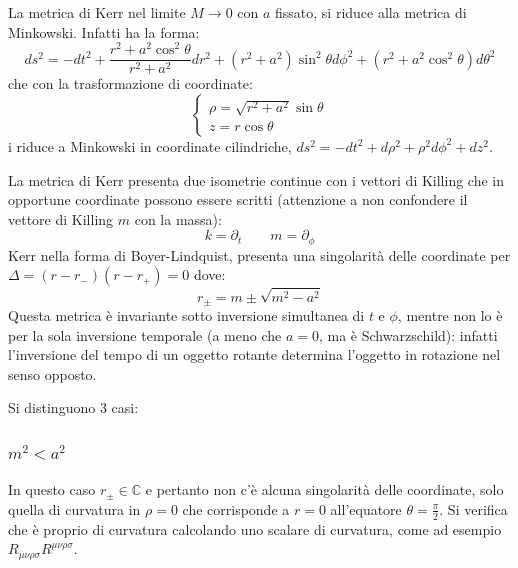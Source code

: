 La metrica di Kerr nel limite $M\rightarrow 0$ con $a$ fissato, si riduce alla metrica di Minkowski. Infatti ha la forma:
\begin{equation*}
    ds^2 = -dt^2 + \frac{r^2 + a^2\cos^2\theta}{r^2 + a^2}dr^2 + (r^2+a^2)\sin^2\theta d\phi^2 + (r^2 + a^2\cos^2\theta)d\theta^2
\end{equation*}
che con la trasformazione di coordinate:
\begin{equation*}
    \left\{ \begin{array}{l}
        \rho = \sqrt{r^2 + a^2}\sin\theta \\
        z = r\cos\theta          
    \end{array}\right.
\end{equation*}
i riduce a Minkowski in coordinate cilindriche, $ds^2 = -dt^2 + d\rho^2 +\rho^2 d\phi^2 + dz^2$.

La metrica di Kerr presenta due isometrie continue con i vettori di Killing che in opportune coordinate possono essere scritti (attenzione a non confondere il vettore di Killing $m$ con la massa):
\begin{equation*}
    k = \partial_t \qquad m =\partial_\phi
\end{equation*}
Kerr nella forma di Boyer-Lindquist, presenta una singolarità delle coordinate per $\Delta = (r - r_-)(r-r_+) = 0$ dove:
\begin{equation*}
    r_\pm = m \pm \sqrt{ m^2 - a^2}
\end{equation*}
Questa metrica è invariante sotto inversione simultanea di $t$ e $\phi$, mentre non lo è per la sola inversione temporale (a meno che $a=0$, ma è Schwarzschild): infatti l'inversione del tempo di un oggetto rotante determina l'oggetto in rotazione nel senso opposto.

Si distinguono 3 casi:

\subsubsection{$m^2 < a^2$} 
In questo caso $r_\pm \in \mathbb{C}$ e pertanto non c'è alcuna singolarità delle coordinate, solo quella di curvatura in $\rho = 0$ che corrisponde a $r= 0$ all'equatore $\theta = \frac{\pi}{2}$. Si verifica che è proprio di curvatura calcolando uno scalare di curvatura, come ad esempio $R_{\mu\nu\rho\sigma}R^{\mu\nu\rho\sigma}$.

